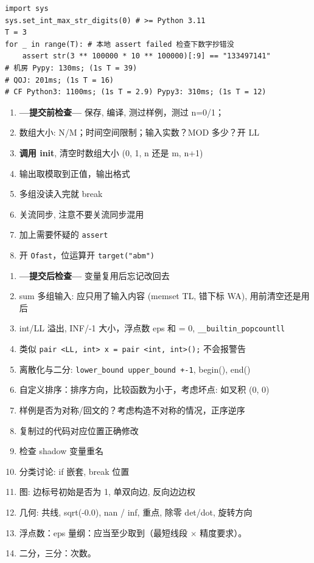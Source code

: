 \begin{small}
\begin{itemize}[leftmargin=0.5mm]
\begin{verbatim}
import sys
sys.set_int_max_str_digits(0) # >= Python 3.11 
T = 3
for _ in range(T): # 本地 assert failed 检查下数字抄错没
    assert str(3 ** 100000 * 10 ** 100000)[:9] == "133497141"
# 机房 Pypy: 130ms; (1s T = 39)
# QOJ: 201ms; (1s T = 16)
# CF Python3: 1100ms; (1s T = 2.9) Pypy3: 310ms; (1s T = 12)
\end{verbatim}
\end{itemize}
\begin{enumerate}[leftmargin=1mm]
	\setlength{\itemsep}{0pt}
	\setlength{\parskip}{0.5pt}
\item \textbf{\large ---提交前检查---} 保存, 编译, 测过样例，测过 n=0/1；
\item 数组大小: N/M；时间空间限制；输入实数？MOD 多少？开 LL
\item \textbf{调用 \large{init}}, 清空时数组大小 (0, 1, n 还是 m, n+1)
\item 输出取模取到正值，输出格式
\item 多组没读入完就 break
\item 关流同步, 注意不要关流同步混用
\item 加上需要怀疑的 \texttt{assert}
\item 开 \texttt{Ofast}，位运算开 \texttt{target("abm")}
\end{enumerate}
\begin{enumerate}[leftmargin=1mm]
\setlength{\itemsep}{0pt}
\setlength{\parskip}{0.5pt}
\item \textbf{\large ---提交后检查---} 变量复用后忘记改回去
\item sum 多组输入: 应只用了输入内容 (memset TL, 错下标 WA), 用前清空还是用后
\item int/LL 溢出, INF/-1 大小，浮点数 eps 和 = 0, \texttt{\_\_builtin\_popcount\large{ll}}
\item 类似 \texttt{pair <LL, int> x = pair <int, int>();} 不会报警告 
\item 离散化与二分: \texttt{lower\_bound upper\_bound +-1}, begin(), end()
\item 自定义排序：排序方向，比较函数为小于，考虑坏点: 如叉积 (0, 0)
\item 样例是否为对称/回文的？考虑构造不对称的情况，正序逆序
\item 复制过的代码对应位置正确修改
\item 检查 shadow 变量重名
\item 分类讨论: if 嵌套, break 位置
\item 图: 边标号初始是否为 1, 单双向边, 反向边边权
\item 几何: 共线, sqrt(-0.0), nan / inf, 重点, 除零 det/dot, 旋转方向
\item 浮点数：eps 量纲：应当至少取到（最短线段 $\times$ 精度要求）。
\item 二分，三分：次数。
\end{enumerate}
\end{small}